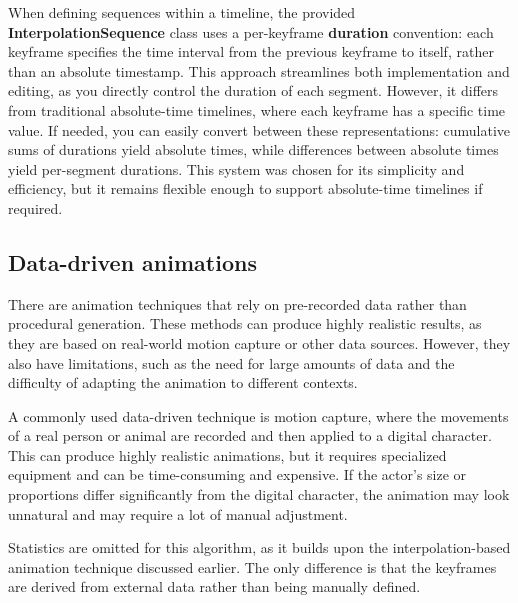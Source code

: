 \pagebreak

\begin{Note}
    When defining sequences within a timeline, the provided \textbf{InterpolationSequence} class uses a per-keyframe \textbf{duration} convention: each keyframe specifies the time interval from the previous keyframe to itself, rather than an absolute timestamp. This approach streamlines both implementation and editing, as you directly control the duration of each segment. However, it differs from traditional absolute-time timelines, where each keyframe has a specific time value. If needed, you can easily convert between these representations: cumulative sums of durations yield absolute times, while differences between absolute times yield per-segment durations. This system was chosen for its simplicity and efficiency, but it remains flexible enough to support absolute-time timelines if required.
\end{Note}


\vspace{80pt}

\subsection{Data-driven animations}
\label{subsec:data-driven-animations}

There are animation techniques that rely on pre-recorded data rather than procedural generation. These methods can produce highly realistic results, as they are based on real-world motion capture or other data sources. However, they also have limitations, such as the need for large amounts of data and the difficulty of adapting the animation to different contexts.

A commonly used data-driven technique is motion capture, where the movements of a real person or animal are recorded and then applied to a digital character. This can produce highly realistic animations, but it requires specialized equipment and can be time-consuming and expensive. If the actor's size or proportions differ significantly from the digital character, the animation may look unnatural and may require a lot of manual adjustment.

Statistics are omitted for this algorithm, as it builds upon the interpolation-based animation technique discussed earlier. The only difference is that the keyframes are derived from external data rather than being manually defined.


